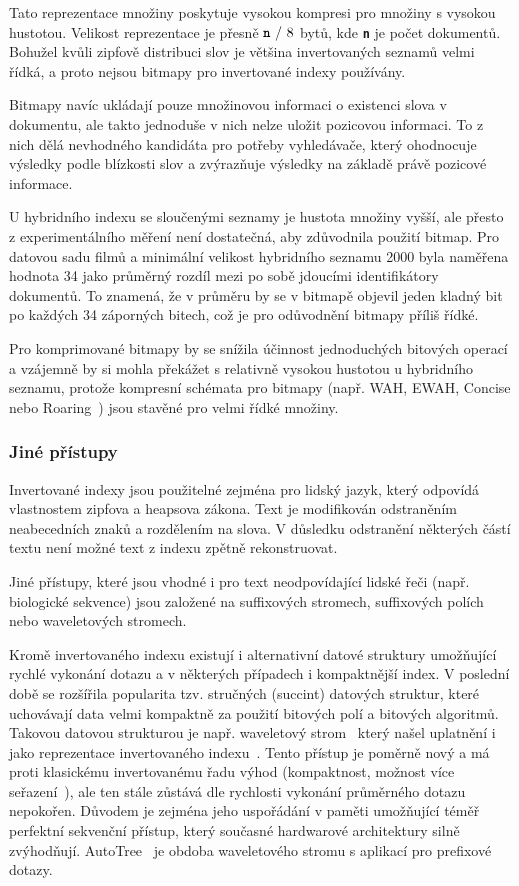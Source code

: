 \documentclass[11pt,letterpaper,oneside,openright]{book}
\newcommand{\bftt}[1]{\texttt{\textbf{#1}}}
\begin{document}
Tato reprezentace množiny poskytuje vysokou kompresi pro množiny s vysokou
hustotou. Velikost reprezentace je přesně $\bftt{n}\ /\ 8$ bytů, kde \bftt{n}
je počet dokumentů. Bohužel kvůli zipfově distribuci slov je většina
invertovaných seznamů velmi řídká, a proto nejsou bitmapy pro invertované
indexy používány.

Bitmapy navíc ukládají pouze množinovou informaci o existenci slova v
dokumentu, ale takto jednoduše v nich nelze uložit pozicovou informaci. To z
nich dělá nevhodného kandidáta pro potřeby vyhledávače, který ohodnocuje
výsledky podle blízkosti slov a zvýrazňuje výsledky na základě právě pozicové
informace.

U hybridního indexu se sloučenými seznamy je hustota množiny vyšší, ale přesto
z experimentálního měření není dostatečná, aby zdůvodnila použití bitmap. Pro
datovou sadu filmů a minimální velikost hybridního seznamu 2000 byla naměřena
hodnota 34 jako průměrný rozdíl mezi po sobě jdoucími identifikátory dokumentů.
To znamená, že v průměru by se v bitmapě objevil jeden kladný bit po každých 34
záporných bitech, což je pro odůvodnění bitmapy příliš řídké.

Pro komprimované bitmapy by se snížila účinnost jednoduchých bitových operací a
vzájemně by si mohla překážet s relativně vysokou hustotou u hybridního
seznamu, protože kompresní schémata pro bitmapy (např. WAH, EWAH, Concise nebo
Roaring~\cite{DBLP:journals/corr/LemireKK16}) jsou stavěné pro velmi řídké
množiny.

\subsubsection{Jiné přístupy}
Invertované indexy jsou použitelné zejména pro lidský jazyk, který odpovídá
vlastnostem zipfova a heapsova zákona. Text je modifikován odstraněním
neabecedních znaků a rozdělením na slova. V důsledku odstranění některých částí
textu není možné text z indexu zpětně rekonstruovat.

Jiné přístupy, které jsou vhodné i pro text neodpovídající lidské řeči (např.
biologické sekvence) jsou založené na suffixových stromech, suffixových polích
nebo waveletových stromech.

Kromě invertovaného indexu existují i alternativní datové struktury umožňující
rychlé vykonání dotazu a v některých případech i kompaktnější index. V poslední
době se rozšířila popularita tzv. stručných (succint) datových struktur, které
uchovávají data velmi kompaktně za použití bitových polí a bitových algoritmů.
Takovou datovou strukturou je např. waveletový
strom~\cite{Grossi:2003:HET:644108.644250} který našel uplatnění i jako
reprezentace invertovaného
indexu~\cite{Ferragina:2007:CRS:1240233.1240243,FERRAGINA2009849}. Tento
přístup je poměrně nový a má proti klasickému invertovanému řadu výhod
(kompaktnost, možnost více seřazení~\cite{Navarro2010}), ale ten stále zůstává
dle rychlosti vykonání průměrného dotazu nepokořen. Důvodem je zejména jeho
uspořádání v paměti umožňující téměř perfektní sekvenční přístup, který
současné hardwarové architektury silně zvýhodňují. AutoTree~\cite{Weber2007} je
obdoba waveletového stromu s aplikací pro prefixové dotazy.
\end{document}
